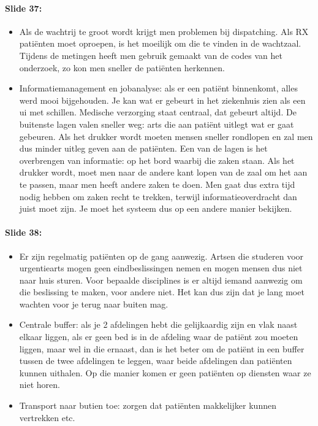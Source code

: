 \documentclass[10pt,a4paper]{report}
\begin{document}
\paragraph{Slide 37:}
\begin{itemize} 
\item Als de wachtrij te groot wordt krijgt men problemen bij dispatching. Als RX pati\"enten moet oproepen, is het moeilijk om die te vinden in de wachtzaal. Tijdens de metingen heeft men gebruik gemaakt van de codes van het onderzoek, zo kon men sneller de pati\"enten herkennen. 
\item Informatiemanagement en jobanalyse: als er een pati\"ent binnenkomt, alles werd mooi bijgehouden. Je kan wat er gebeurt in het ziekenhuis zien als een ui met schillen. Medische verzorging staat centraal, dat gebeurt altijd. De buitenste lagen valen sneller weg: arts die aan pati\"ent uitlegt wat er gaat gebeuren. Als het drukker wordt moeten mensen sneller rondlopen en zal men dus minder uitleg geven aan de pati\"enten. Een van de lagen is het overbrengen van informatie: op het bord waarbij die zaken staan. Als het drukker wordt, moet men naar de andere kant lopen van de zaal om het aan te passen, maar men heeft andere zaken te doen. Men gaat dus extra tijd nodig hebben om zaken recht te trekken, terwijl informatieoverdracht dan juist moet zijn. Je moet het systeem dus op een andere manier bekijken. 
\end{itemize}

\paragraph{Slide 38:}
\begin{itemize} 
\item Er zijn regelmatig pati\"enten op de gang aanwezig. Artsen die studeren voor urgentiearts mogen geen eindbeslissingen nemen en mogen mensen dus niet naar huis sturen. Voor bepaalde disciplines is er altijd iemand aanwezig om die beslissing te maken, voor andere niet. Het kan dus zijn dat je lang moet wachten voor je terug naar buiten mag. 
\item Centrale buffer: als je 2 afdelingen hebt die gelijkaardig zijn en vlak naast elkaar liggen, als er geen bed  is in de afdeling waar de pati\"ent zou moeten liggen, maar wel in die ernaast, dan is het beter om de pati\"ent in een buffer tussen de twee afdelingen te leggen, waar beide afdelingen dan pati\"enten kunnen uithalen. Op die manier komen er geen pati\"enten op diensten waar ze niet horen.
\item Transport naar butien toe: zorgen dat pati\"enten makkelijker kunnen vertrekken etc.
\end{itemize}
\end{document}
